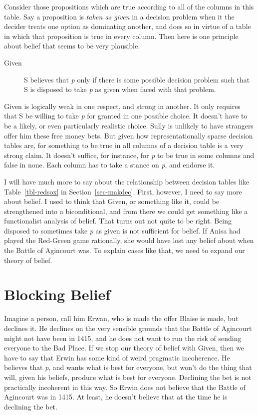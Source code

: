 \documentclass[
  12pt,
  letterpaper,
]{scrbook}
\begin{document}
Consider those propositions which are true according to all of the
columns in this table. Say a proposition is \emph{taken as given} in a
decision problem when it the decider treats one option as dominating
another, and does so in virtue of a table in which that proposition is
true in every column. Then here is one principle about belief that seems
to be very plausible.

\begin{description}
\item[Given]
S believes that \emph{p} only if there is some possible decision problem
such that S is disposed to take \emph{p} as given when faced with that
problem.
\end{description}

Given is logically weak in one respect, and strong in another. It only
requires that S be willing to take \emph{p} for granted in one possible
choice. It doesn't have to be a likely, or even particularly realistic
choice. Sully is unlikely to have strangers offer him these free money
bets. But given how representationally sparse decision tables are, for
something to be true in all columns of a decision table is a very strong
claim. It doesn't suffice, for instance, for \emph{p} to be true in some
columns and false in none. Each column has to take a stance on \emph{p},
and endorse it.

I will have much more to say about the relationship between decision
tables like Table~\ref{tbl-redsox} in Section~\ref{sec-makdec}. First,
however, I need to say more about belief. I used to think that Given, or
something like it, could be strengthened into a biconditional, and from
there we could get something like a functionalist analysis of belief.
That turns out not quite to be right. Being disposed to sometimes take
\emph{p} as given is not sufficient for belief. If Anisa had played the
Red-Green game rationally, she would have lost any belief about when the
Battle of Agincourt was. To explain cases like that, we need to expand
our theory of belief.

\section{Blocking Belief}\label{sec-block}

Imagine a person, call him Erwan, who is made the offer Blaise is made,
but declines it. He declines on the very sensible grounds that the
Battle of Agincourt might not have been in 1415, and he does not want to
run the risk of sending everyone to the Bad Place. If we stop our theory
of belief with Given, then we have to say that Erwin has some kind of
weird pragmatic incoherence. He believes that \emph{p}, and wants what
is best for everyone, but won't do the thing that will, given his
beliefs, produce what is best for everyone. Declining the bet is not
practically incoherent in this way. So Erwin does not believe that the
Battle of Agincourt was in 1415. At least, he doesn't believe that at
the time he is declining the bet.
\end{document}
